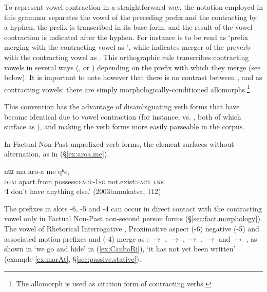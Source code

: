 To represent vowel contraction in a straightforward way, the notation employed in this grammar separates the vowel of the preceding prefix and the contracting by a hyphen, the prefix is transcribed in its base form, and the result of the vowel contraction is indicated after the hyphen. For instance  is to be read as `prefix  merging with the contracting vowel as ', while  indicates merger of the preverb with the contracting vowel as . This orthographic rule transcribes contracting vowels in several ways (,  or ) depending on the prefix with which they merge (see  below). It is important to note however that there is no contrast between ,  and  as contracting vowels: there are simply morphologically-conditioned allomorphs.\footnote{The  allomorph is used as citation form of contracting verbs. }
 
 This convention has the advantage of disambiguating verb forms that have become identical due to vowel contraction (for instance,  vs. , both of which surface as ), and making the verb forms more easily parseable in the corpus.
 
 In Factual Non-Past unprefixed verb forms, the  element surfaces without alternation, as in (§\ref{ex:aroa.me}). 
 
 \begin{exe}
 	\ex \label{ex:aroa.me}
 	\gll nɯ ma aro-a me qʰe, \\
 	\textsc{dem} apart.from possess:\textsc{fact}-\textsc{1sg} not.exist:\textsc{fact} \textsc{lnk} \\
 	\glt `I don't have anything else.' (2003tamukatsa, 112)
 \end{exe}
 
 The prefixes in slots -6, -5 and -4 can occur in direct contact with the contracting vowel  only in Factual Non-Past non-second person forms (§\ref{sec:fact.morphology}). The vowel of Rhetorical Interrogative , Proximative aspect  (-6) negative  (-5) and associated motion prefixes  and  (-4) merge as :  $\rightarrow$ ,  $\rightarrow$ ,  $\rightarrow$ ,  $\rightarrow$  and  $\rightarrow$ , as shown in  `we go and hide'  in (\ref{ex:CanbaRi}),  `it has not yet been written'  (example \ref{ex:marAt}, §\ref{sec:passive.stative}).
 
